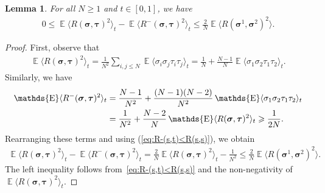 \documentclass[10pt,a4paper]{amsart}
\newtheorem{lem}{Lemma}
\DeclareMathOperator{\E}{\mathds{E}}
\renewcommand{\ge}{\geqslant}
\renewcommand{\geq}{\geqslant}
\newcommand{\la}{\langle}
\renewcommand{\leq}{\leqslant}
\newcommand{\mvgs}{\boldsymbol{\sigma}}\newcommand{\mvgS}{\boldsymbol{\Sigma}}\newcommand{\mvgt}{\boldsymbol{\tau}}
\newcommand{\ra}{\rangle}
\begin{document}
\begin{lem}\label{lem:1st_deriv_2}
For all \(N \geq 1\) and \(t \in [0,1]\), we have
    \begin{align*}
        0 \leq \E\la R(\mvgs, \mvgt)^2 \ra_{t} -\E\la R^-(\mvgs, \mvgt)^2 \ra_{t} 
        \leq \frac{2}{N} \E\la R(\mvgs^1, \mvgs^2)^2 \ra.
    \end{align*}
\end{lem}

\begin{proof}
    First, observe that
    \begin{align*}
        \E\la R(\mvgs, \mvgt)^2 \ra_{t}
        = \frac{1}{N^2} \sum_{i,j \leq N} \E \la \sigma_i \sigma_j \tau_i \tau_j \ra_{t}
        = \frac{1}{N} + \frac{N-1}{N} \E \la \sigma_1 \sigma_2 \tau_1 \tau_2 \ra_{t}.
    \end{align*}
    Similarly, we have
    \begin{align}
        \E\la R^-(\mvgs, \mvgt)^2 \ra_{t}
        &= \frac{N-1}{N^2} + \frac{(N-1)(N-2)}{N^2} \E \la \sigma_1 \sigma_2 \tau_1 \tau_2 \ra_{t} \notag\\
        &= \frac{1}{N^2}+\frac{N-2}{N} \E\la R(\mvgs, \mvgt)^2 \ra_{t} \ge \frac1{2N}.\label{eq:R+}
    \end{align}
    Rearranging these terms and using (\ref{eq:R-(s,t)<R(s,s)}), we obtain
    \begin{align*}
        \E\la R(\mvgs, \mvgt)^2 \ra_{t} - \E\la R^-(\mvgs, \mvgt)^2 \ra_{t}
        = \frac{2}{N} \E\la R(\mvgs, \mvgt)^2 \ra_{t} - \frac{1}{N^2} 
        \leq \frac{2}{N} \E\la R(\mvgs^1, \mvgs^2)^2 \ra.
    \end{align*}
    The left inequality follows from~\eqref{eq:R-(s,t)<R(s,s)} and the non-negativity of \(\E\la R(\mvgs,\mvgt)^2\ra_t\).
\end{proof}
\end{document}
